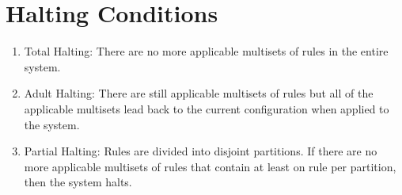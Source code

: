 \documentclass[a4paper]{article}
\theoremstyle{definition}
\begin{document}

\section{Halting Conditions}\label{app-halt}

\begin{enumerate}
\item Total Halting: There are no more applicable multisets of rules in the entire system. 
\item Adult Halting: There are still applicable multisets of rules but all of the applicable 
      multisets lead back to the current configuration when applied to the system.
\item Partial Halting: Rules are divided into disjoint partitions. If there are no more applicable
      multisets of rules that contain at least on rule per partition, then the system halts.
\end{enumerate}



\end{document}
